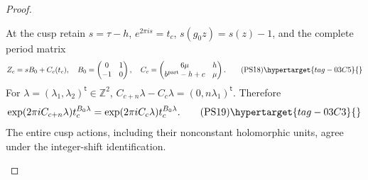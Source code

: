 \begin{proof}
\begin{enumerate}[label=\arabic*.,leftmargin=*]
At the cusp retain $s=\tau-h$, $e^{2\pi is}=t_c$, $s(g_0z)=s(z)-1$,
and the complete period matrix
\[
 Z_c=sB_0+C_c(t_c),\quad
 B_0=\begin{pmatrix}0&1\\-1&0\end{pmatrix},\quad
 C_c=\begin{pmatrix}6\mu&h\\ b^{\mathrm{part}}-h+c&\mu\end{pmatrix}.
 \tag{PS18}\hypertarget{tag-03C5}{}\label{wb:pshift:eq:cusp-periods}
\]
For $\lambda=(\lambda_1,\lambda_2)^{\mathsf t}\in\mathbb Z^2$,
$C_{c+n}\lambda-C_c\lambda=(0,n\lambda_1)^{\mathsf t}$. Therefore
\[
 \exp(2\pi iC_{c+n}\lambda)t_c^{B_0\lambda}
       =\exp(2\pi iC_c\lambda)t_c^{B_0\lambda}.
 \tag{PS19}\hypertarget{tag-03C3}{}\label{wb:pshift:eq:cusp-actions-identical}
\]
The entire cusp actions, including their nonconstant holomorphic units,
agree under the integer-shift identification.


\end{enumerate}
\end{proof}
